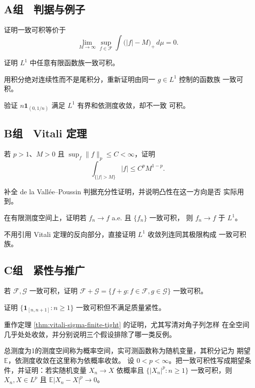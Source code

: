 \subsection*{A组　判据与例子}
\begin{enumerate}[label=\textbf{\thechapter.\arabic*.}]
证明一致可积等价于
\[
 \lim_{M\to\infty}\sup_{f\in\mathcal F}
 \int\bigl(|f|-M\bigr)_+\,d\mu=0.
\]

证明 \(L^1\) 中任意有限函数族一致可积。

用积分绝对连续性而不是尾积分，重新证明由同一 \(g\in L^1\) 控制的函数族
一致可积。

验证 \(n\mathbf1_{(0,1/n)}\) 满足 \(L^1\) 有界和依测度收敛，却不一致
可积。

\end{enumerate}
\subsection*{B组　Vitali 定理}
\begin{enumerate}[label=\textbf{\thechapter.\arabic*.},resume]
若 \(p>1\)、\(M>0\) 且 \(\sup_f\|f\|_p\le C<\infty\)，证明
\[
 \int_{\{|f|>M\}}|f|\le C^pM^{1-p}.
\]

补全 de la Vallée--Poussin 判据充分性证明，并说明凸性在这一方向是否
实际用到。

在有限测度空间上，证明若 \(f_n\to f\) a.e. 且 \(\{f_n\}\) 一致可积，
则 \(f_n\to f\) 于 \(L^1\)。

不用引用 Vitali 定理的反向部分，直接证明 \(L^1\) 收敛列连同其极限构成
一致可积族。

\end{enumerate}
\subsection*{C组　紧性与推广}
\begin{enumerate}[label=\textbf{\thechapter.\arabic*.},resume]
若 \(\mathcal F,\mathcal G\) 一致可积，证明
\(\mathcal F+\mathcal G=\{f+g:f\in\mathcal F,g\in\mathcal G\}\)
一致可积。

证明 \(\{\mathbf1_{[n,n+1]}:n\ge1\}\) 一致可积但不满足质量紧性。

重作定理 \ref{thm:vitali-sigma-finite-tight} 的证明，尤其写清对角子列怎样
在全空间几乎处处收敛，并分别说明三个假设排除了哪一类反例。

总测度为1的测度空间称为概率空间，实可测函数称为随机变量，其积分记为
期望 \(\mathbb E\)，依测度收敛在这里称为依概率收敛。
设 \(0<p<\infty\)。把一致可积性写成期望条件，并证明：若实随机变量
\(X_n\to X\) 依概率且 \(\{|X_n|^p:n\ge1\}\) 一致可积，则
\(X_n,X\in L^p\) 且 \(\mathbb E|X_n-X|^p\to0\)。
\end{enumerate}
